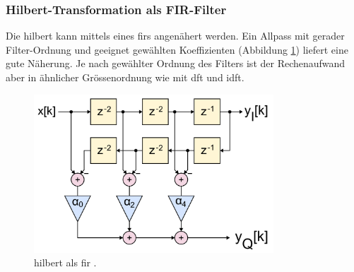 \subsubsection{Hilbert-Transformation als FIR-Filter}
Die \gls{hilbert} kann mittels eines \gls{fir}s angenähert werden. Ein Allpass mit gerader Filter-Ordnung und geeignet gewählten Koeffizienten (Abbildung \ref{fig.hilbertFIR}) liefert eine gute Näherung. Je nach gewählter Ordnung des Filters ist der Rechenaufwand aber in ähnlicher Grössenordnung wie mit \gls{dft} und \gls{idft}.
\begin{figure}
	\centering
		\includegraphics[width=0.8\textwidth]{images/FIR_Hilbert_Transform_Filter.png}
	\caption{\gls{hilbert} als \gls{fir} \cite{wiki_hilbertFIR}.}
	\label{fig.hilbertFIR}
\end{figure}

